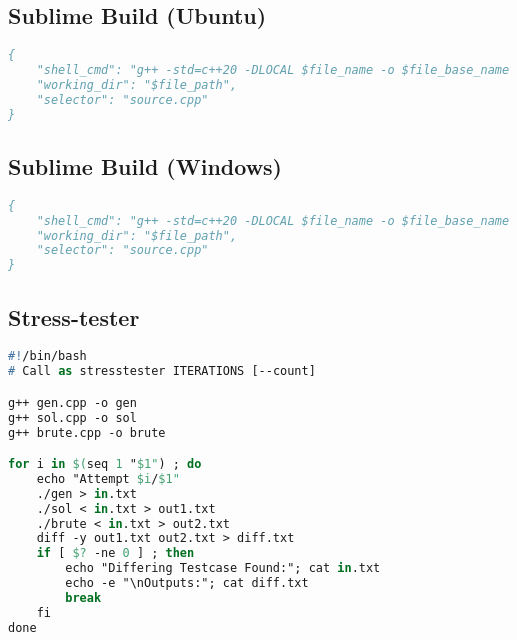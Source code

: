 \subsection*{Sublime Build (Ubuntu)}
\begin{lstlisting}[language= Pascal, commentstyle=\color{black}, numberstyle=\tiny\color{black}, keywordstyle=\color{black}, stringstyle=\color{black},
]
{
    "shell_cmd": "g++ -std=c++20 -DLOCAL $file_name -o $file_base_name &&timeout 5s ./$file_base_name<in.txt>out.txt",
    "working_dir": "$file_path",
    "selector": "source.cpp"
}
\end{lstlisting}

\subsection*{Sublime Build (Windows)}
\begin{lstlisting}[language= Pascal, commentstyle=\color{black}, numberstyle=\tiny\color{black}, keywordstyle=\color{black}, stringstyle=\color{black},
]
{
    "shell_cmd": "g++ -std=c++20 -DLOCAL $file_name -o $file_base_name && $file_base_name<in.txt>out.txt",
    "working_dir": "$file_path",
    "selector": "source.cpp"
}
\end{lstlisting}


\subsection*{Stress-tester}
\begin{lstlisting}[language= Pascal, commentstyle=\color{black}, numberstyle=\tiny\color{black}, keywordstyle=\color{black}, stringstyle=\color{black},
]
#!/bin/bash
# Call as stresstester ITERATIONS [--count]

g++ gen.cpp -o gen
g++ sol.cpp -o sol
g++ brute.cpp -o brute

for i in $(seq 1 "$1") ; do
    echo "Attempt $i/$1"
    ./gen > in.txt
    ./sol < in.txt > out1.txt
    ./brute < in.txt > out2.txt
    diff -y out1.txt out2.txt > diff.txt
    if [ $? -ne 0 ] ; then
        echo "Differing Testcase Found:"; cat in.txt
        echo -e "\nOutputs:"; cat diff.txt
        break
    fi
done
\end{lstlisting}
